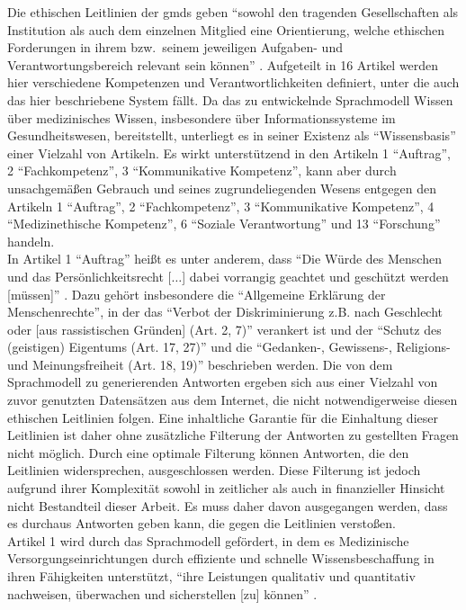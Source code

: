 Die ethischen Leitlinien der \ac{gmds} \citep{gmds_eth} geben \enquote{sowohl den tragenden Gesellschaften als Institution als auch dem einzelnen Mitglied eine Orientierung,
  welche ethischen Forderungen in ihrem bzw.\ seinem jeweiligen Aufgaben- und Verantwortungsbereich relevant sein können} \citep{gmds_eth}.
Aufgeteilt in 16 Artikel werden hier verschiedene Kompetenzen und Verantwortlichkeiten definiert, unter die auch das hier beschriebene System fällt.
Da das zu entwickelnde Sprachmodell Wissen über medizinisches Wissen, insbesondere über Informationssysteme im Gesundheitswesen, bereitstellt,
unterliegt es in seiner Existenz als \enquote{Wissensbasis} einer Vielzahl von Artikeln.
Es wirkt unterstützend in den Artikeln 1 \enquote{Auftrag}, 2 \enquote{Fachkompetenz}, 3 \enquote{Kommunikative Kompetenz},
kann aber durch unsachgemäßen Gebrauch und seines zugrundeliegenden Wesens entgegen den Artikeln 1 \enquote{Auftrag}, 2 \enquote{Fachkompetenz}, 3 \enquote{Kommunikative Kompetenz},
4 \enquote{Medizinethische Kompetenz}, 6 \enquote{Soziale Verantwortung} und 13 \enquote{Forschung} handeln.\\

In Artikel 1 \enquote{Auftrag} heißt es unter anderem, dass
\enquote{Die Würde des Menschen und das Persönlichkeitsrecht [$\dots$] dabei vorrangig geachtet und geschützt werden [müssen]} \citep{gmds_eth}.
Dazu gehört insbesondere die \enquote{Allgemeine Erklärung der Menschenrechte},
in der das \enquote{Verbot der Diskriminierung z.B. nach Geschlecht oder [aus rassistischen Gründen] (Art. 2, 7)}
verankert ist und
der \enquote{Schutz des (geistigen) Eigentums (Art. 17, 27)} und die \enquote{Gedanken-, Gewissens-, Religions- und Meinungsfreiheit (Art. 18, 19)} beschrieben werden.
Die von dem Sprachmodell zu generierenden Antworten ergeben sich aus einer Vielzahl von zuvor genutzten Datensätzen aus dem Internet, die nicht notwendigerweise diesen ethischen Leitlinien folgen.
Eine inhaltliche Garantie für die Einhaltung dieser Leitlinien ist daher ohne zusätzliche Filterung der Antworten zu gestellten Fragen nicht möglich.
Durch eine optimale Filterung können Antworten, die den Leitlinien widersprechen, ausgeschlossen werden.
Diese Filterung ist jedoch aufgrund ihrer Komplexität sowohl in zeitlicher als auch in finanzieller Hinsicht nicht Bestandteil dieser Arbeit.
Es muss daher davon ausgegangen werden, dass es durchaus Antworten geben kann, die gegen die Leitlinien verstoßen.\\

Artikel 1 wird durch das Sprachmodell gefördert, in dem es Medizinische Versorgungseinrichtungen durch effiziente und schnelle Wissensbeschaffung in ihren Fähigkeiten unterstützt,
\enquote{ihre Leistungen qualitativ und quantitativ nachweisen, überwachen und sicherstellen [zu] können} \citep{gmds_eth}.\\

